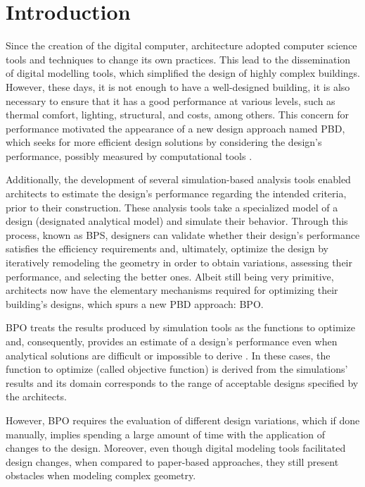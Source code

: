 \section{Introduction}
\label{sec:intro}
	
	Since the creation of the digital computer, architecture adopted computer science tools and techniques to change its own practices. This lead to the dissemination of digital modelling tools, which simplified the design of highly complex buildings. However, these days, it is not enough to have a well-designed building, it is also necessary to ensure that it has a good performance at various levels, such as thermal comfort, lighting, structural, and costs, among others. This concern for performance motivated the appearance of a new design approach named \ac{PBD}, which seeks for more efficient design solutions by considering the design's performance, possibly measured by computational tools \cite{Oxman2006PBD}. 
	
	Additionally, the development of several simulation-based analysis tools enabled architects to estimate the design's performance regarding the intended criteria, prior to their construction. These analysis tools take a specialized model of a design (designated analytical model) and simulate their behavior. Through this process, known as \ac{BPS},
	designers can validate whether their design's performance satisfies the efficiency requirements and, ultimately, optimize the design by iteratively remodeling the geometry in order to obtain variations, assessing their performance, and selecting the better ones. Albeit still being very primitive, architects now have the elementary mechanisms required for optimizing their building's designs, which spurs a new \ac{PBD} approach: \ac{BPO}.
	
	\ac{BPO} treats the results produced by simulation tools as the functions to optimize and, consequently, provides an estimate of a design's performance even when analytical solutions are difficult or impossible to derive \cite{Kolda2003}. In these cases, the function to optimize (called objective function) is derived from the simulations' results and its domain corresponds to the range of acceptable designs specified by the architects.
	
	However, \ac{BPO} requires the evaluation of different design variations, which if done manually, implies spending a large amount of time with the application of changes to the design. Moreover, even though digital modeling tools facilitated design changes, when compared to paper-based approaches, they still present obstacles when modeling complex geometry.
	
